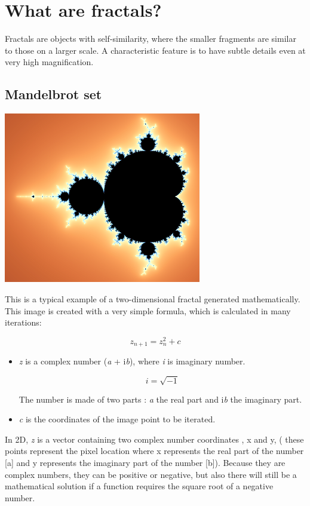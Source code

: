 \section{What are fractals?}\label{what-are-fractals}

Fractals are objects with self-similarity, where the smaller fragments
are similar to those on a larger scale. A characteristic feature is to
have subtle details even at very high magnification.

\subsection{Mandelbrot set}\label{mandelbrot-set}

\includegraphics[width=3.39514in,height=2.94167in]{img/manual/media/image1.png}

This is a typical example of a two-dimensional fractal generated
mathematically. This image is created with a very simple formula, which
is calculated in many iterations:

\[z_{n + 1} = z_{n}^{2} + c\]

\begin{itemize}
 

\item\emph{z} is a complex number (\emph{a} + i\emph{b}), where \emph{i} is imaginary
number. 

\[ i = \sqrt{-1} \]

The number is made of two parts : \emph{a} the real part
and i\emph{b} the imaginary part.

\item\emph{c} is the coordinates of the image point to be iterated.
\end{itemize}

In 2D, \emph{z} is a vector containing two complex number coordinates , x
and y, ( these points represent the pixel location where x represents
the real part of the number {[}a{]} and y represents the imaginary part
of the number {[}b{]}). Because they are complex numbers, they can be
positive or negative, but also there will still be a mathematical
solution if a function requires the square root of a negative number.

